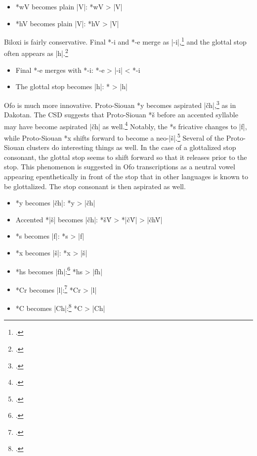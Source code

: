 \documentclass[output=paper]{LSP/langsci}
\begin{document}
\begin{itemize}
\item *wV becomes plain |V|: \hspace{1em} *wV	>	|V|
\item *hV becomes plain |V|: \hspace{1em} *hV	>	|V|
\end{itemize}


Biloxi is fairly conservative.  Final *-i and *-e merge as |-i|,\footnote{\citealt[901]{CSD2006}.}  and the glottal stop often appears as |h|.\footnote{\citealt[103]{CSD2006}.} 

\begin{itemize}
\item Final *-e merges with *-i: \hspace{2.1em} *-e	>	|-i|	<	*-i
\item The glottal stop becomes |h|: \hspace{1em} *\textsuperscript{}	>	|h|
\end{itemize}


Ofo is much more innovative.  Proto-Siouan *y becomes aspirated |\v{c}h|,\footnote{\citealt[85, 242]{CSD2006}.} as in Dakotan.  The CSD suggests that Proto-Siouan *š before an accented syllable may have become aspirated |\v{c}h| as well.\footnote{\citealt[827]{CSD2006}.} Notably, the *s fricative changes to |f|, while Proto-Siouan *x shifts forward to become a neo-|š|.\footnote{\citealt[174, 299]{CSD2006}.} Several of the Proto-Siouan clusters do interesting things as well.  In the case of a glottalized stop consonant, the glottal stop seems to shift forward so that it releases prior to the stop.  This phenomenon is suggested in Ofo transcriptions as a neutral vowel appearing epenthetically in front of the stop that in other languages is known to be glottalized.  The stop consonant is then aspirated as well.

\begin{itemize}
\item *y becomes |\v{c}h|: \hspace{5em} *y	>	|\v{c}h|
\item Accented *|š| becomes |\v{c}h|: \hspace{1em} *š\'V	>	*|\v{c}\'V|	>	|\v{c}h\'V|
\item *s becomes |f|: \hspace{6em} *s	>	|f|
\item *x becomes |š|: \hspace{6em} 	*x	>	|š|
\item *hs becomes |fh|:\footnote{\citealt[174, 299]{CSD2006}.}  \hspace{4.8em} 			*hs	>	|fh|
\item *Cr becomes |l|:\footnote{\citealt[90]{CSD2006}.}  \hspace{5em} 			*Cr	>	|l|
\item *C\textsuperscript{} becomes |Ch|:\footnote{\citealt[229, 232]{CSD2006}.}  \hspace{3.9em} *C\textsuperscript{}	>	|Ch|
\end{itemize}
\end{document}
